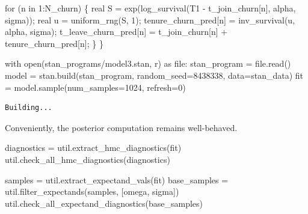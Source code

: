 \documentclass[
  letterpaper,
  DIV=11,
  numbers=noendperiod]{scrartcl}
\newenvironment{Shaded}{\begin{snugshade}}{\end{snugshade}}
\newcommand{\BuiltInTok}[1]{\textcolor[rgb]{0.00,0.23,0.31}{#1}}
\newcommand{\ControlFlowTok}[1]{\textcolor[rgb]{0.00,0.23,0.31}{#1}}
\newcommand{\DataTypeTok}[1]{\textcolor[rgb]{0.68,0.00,0.00}{#1}}
\newcommand{\DecValTok}[1]{\textcolor[rgb]{0.68,0.00,0.00}{#1}}
\newcommand{\ImportTok}[1]{\textcolor[rgb]{0.00,0.46,0.62}{#1}}
\newcommand{\NormalTok}[1]{\textcolor[rgb]{0.00,0.23,0.31}{#1}}
\newcommand{\OperatorTok}[1]{\textcolor[rgb]{0.37,0.37,0.37}{#1}}
\newcommand{\StringTok}[1]{\textcolor[rgb]{0.13,0.47,0.30}{#1}}
\begin{document}
\begin{codelisting}
\begin{Shaded}
\begin{Highlighting}[]
  \ControlFlowTok{for}\NormalTok{ (n }\ControlFlowTok{in} \DecValTok{1}\NormalTok{:N\_churn) \{}
    \DataTypeTok{real}\NormalTok{ S = exp(log\_survival(T1 {-} t\_join\_churn[n],}
\NormalTok{                              alpha, sigma));}
    \DataTypeTok{real}\NormalTok{ u = uniform\_rng(S, }\DecValTok{1}\NormalTok{);}
\NormalTok{    tenure\_churn\_pred[n]}
\NormalTok{      = inv\_survival(u, alpha, sigma);}
\NormalTok{    t\_leave\_churn\_pred[n]}
\NormalTok{      = t\_join\_churn[n] + tenure\_churn\_pred[n];}
\NormalTok{  \}}
\NormalTok{\}}
\end{Highlighting}
\end{Shaded}

\end{codelisting}

\begin{Shaded}
\begin{Highlighting}[]
\ControlFlowTok{with} \BuiltInTok{open}\NormalTok{(}\StringTok{\textquotesingle{}stan\_programs/model3.stan\textquotesingle{}}\NormalTok{, }\StringTok{\textquotesingle{}r\textquotesingle{}}\NormalTok{) }\ImportTok{as} \BuiltInTok{file}\NormalTok{:}
\NormalTok{  stan\_program }\OperatorTok{=} \BuiltInTok{file}\NormalTok{.read()}
\NormalTok{model }\OperatorTok{=}\NormalTok{ stan.build(stan\_program,}
\NormalTok{                   random\_seed}\OperatorTok{=}\DecValTok{8438338}\NormalTok{,}
\NormalTok{                   data}\OperatorTok{=}\NormalTok{stan\_data)}
\NormalTok{fit }\OperatorTok{=}\NormalTok{ model.sample(num\_samples}\OperatorTok{=}\DecValTok{1024}\NormalTok{, refresh}\OperatorTok{=}\DecValTok{0}\NormalTok{)}
\end{Highlighting}
\end{Shaded}

\begin{verbatim}
Building...
\end{verbatim}

Conveniently, the posterior computation remains well-behaved.

\begin{Shaded}
\begin{Highlighting}[]
\NormalTok{diagnostics }\OperatorTok{=}\NormalTok{ util.extract\_hmc\_diagnostics(fit)}
\NormalTok{util.check\_all\_hmc\_diagnostics(diagnostics)}

\NormalTok{samples }\OperatorTok{=}\NormalTok{ util.extract\_expectand\_vals(fit)}
\NormalTok{base\_samples }\OperatorTok{=}\NormalTok{ util.filter\_expectands(samples,}
\NormalTok{                                      [}\StringTok{\textquotesingle{}omega\textquotesingle{}}\NormalTok{, }\StringTok{\textquotesingle{}sigma\textquotesingle{}}\NormalTok{])}
\NormalTok{util.check\_all\_expectand\_diagnostics(base\_samples)}
\end{Highlighting}
\end{Shaded}
\end{document}
